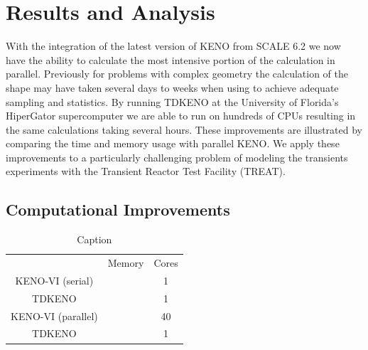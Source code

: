 \documentclass{anstrans}
\renewcommand{\vec}[1]{\bm{#1}} %
\newcommand{\vd}{\bm{\cdot}} %
\newcommand{\grad}{\vec{\nabla}} %
\newcommand{\ud}{\mathop{}\!\mathrm{d}} %
\begin{document}

\section{Results and Analysis}
With the integration of the latest version of KENO from SCALE 6.2 we now have the ability to calculate the most intensive portion of the calculation in parallel.  Previously for problems with complex geometry the calculation of the shape may have taken several days to weeks when using to achieve adequate sampling and statistics.  By running TDKENO at the University of Florida's HiperGator supercomputer we are able to run on hundreds of CPUs resulting in the same calculations taking several hours.  These improvements are illustrated by comparing the time and memory usage with parallel KENO.  We apply these improvements to a particularly challenging problem of modeling the transients experiments with the Transient Reactor Test Facility (TREAT).



\subsection{Computational Improvements}

\begin{table}[h]
    \centering
    \begin{tabular}{c|c|c}
                           & Memory & Cores \\
        KENO-VI (serial)   &        & 1 \\ 
        TDKENO             &        & 1  \\
        KENO-VI (parallel) &        & 40 \\
        TDKENO             &        & 1 \\
    \end{tabular}
    \caption{Caption}
    \label{tab:my_label}
\end{table}
\end{document}
